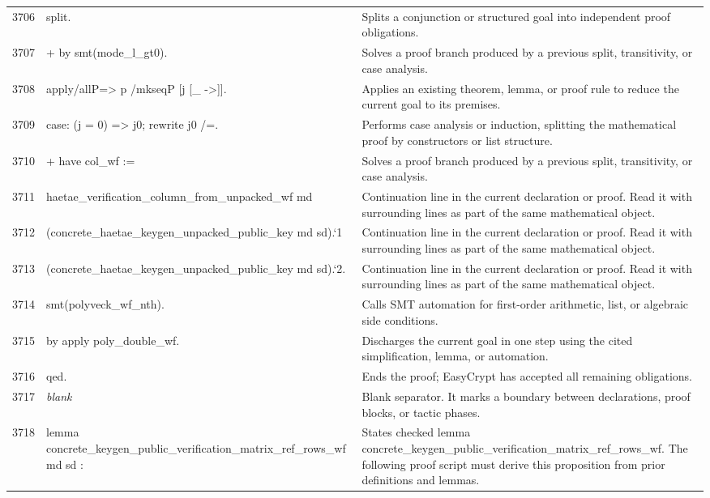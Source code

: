 \documentclass[10pt]{article}
\begin{document}
\begin{longtable}{r L{0.53\textwidth} L{0.37\textwidth}}
3706 & {\ttfamily\scriptsize split.} & Splits a conjunction or structured goal into independent proof obligations. \\
3707 & {\ttfamily\scriptsize + by smt(mode\_l\_gt0).} & Solves a proof branch produced by a previous split, transitivity, or case analysis. \\
3708 & {\ttfamily\scriptsize apply/allP=> p /mkseqP [j [\_ ->]].} & Applies an existing theorem, lemma, or proof rule to reduce the current goal to its premises. \\
3709 & {\ttfamily\scriptsize case: (j = 0) => j0; rewrite j0 /=.} & Performs case analysis or induction, splitting the mathematical proof by constructors or list structure. \\
3710 & {\ttfamily\scriptsize + have col\_wf :=} & Solves a proof branch produced by a previous split, transitivity, or case analysis. \\
3711 & {\ttfamily\scriptsize     haetae\_verification\_column\_from\_unpacked\_wf md} & Continuation line in the current declaration or proof.  Read it with surrounding lines as part of the same mathematical object. \\
3712 & {\ttfamily\scriptsize       (concrete\_haetae\_keygen\_unpacked\_public\_key md sd).`1} & Continuation line in the current declaration or proof.  Read it with surrounding lines as part of the same mathematical object. \\
3713 & {\ttfamily\scriptsize       (concrete\_haetae\_keygen\_unpacked\_public\_key md sd).`2.} & Continuation line in the current declaration or proof.  Read it with surrounding lines as part of the same mathematical object. \\
3714 & {\ttfamily\scriptsize   smt(polyveck\_wf\_nth).} & Calls SMT automation for first-order arithmetic, list, or algebraic side conditions. \\
3715 & {\ttfamily\scriptsize by apply poly\_double\_wf.} & Discharges the current goal in one step using the cited simplification, lemma, or automation. \\
3716 & {\ttfamily\scriptsize qed.} & Ends the proof; EasyCrypt has accepted all remaining obligations. \\
3717 & {\ttfamily\scriptsize \emph{blank}} & Blank separator.  It marks a boundary between declarations, proof blocks, or tactic phases. \\
3718 & {\ttfamily\scriptsize lemma concrete\_keygen\_public\_verification\_matrix\_ref\_rows\_wf md sd :} & States checked lemma concrete\_keygen\_public\_verification\_matrix\_ref\_rows\_wf.  The following proof script must derive this proposition from prior definitions and lemmas. \\

\end{longtable}
\end{document}
